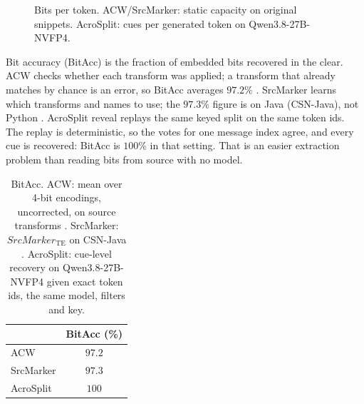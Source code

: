 \documentclass[11pt]{article}
\begin{document}
\begin{figure}[t]
\centering
{}
\caption{Bits per token.
ACW/SrcMarker: static capacity on original snippets.
AcroSplit: cues per generated token on Qwen3.8-27B-NVFP4.}
\label{fig:density}
\end{figure}

Bit accuracy (BitAcc) is the fraction of embedded bits recovered in the clear.
ACW checks whether each transform was applied; a transform that already matches by chance is an error, so BitAcc averages $97.2\%$ \citep{li2024acw}.
SrcMarker learns which transforms and names to use; the $97.3\%$ figure is on Java (CSN-Java), not Python \citep{yang2024srcmarker}.
AcroSplit reveal replays the same keyed split on the same token ids.
The replay is deterministic, so the votes for one message index agree, and every cue is recovered: BitAcc is $100\%$ in that setting.
That is an easier extraction problem than reading bits from source with no model.

\begin{table}[t]
\centering
\small
\begin{tabular}{@{}lc@{}}
\toprule
 & BitAcc (\%) \\
\midrule
ACW & $97.2$ \\
SrcMarker & $97.3$ \\
AcroSplit & $100$ \\
\bottomrule
\end{tabular}
\caption{BitAcc.
ACW: mean over 4-bit encodings, uncorrected, on source transforms \citep{li2024acw}.
SrcMarker: $SrcMarker_{\mathrm{TE}}$ on CSN-Java \citep{yang2024srcmarker}.
AcroSplit: cue-level recovery on Qwen3.8-27B-NVFP4 given exact token ids, the same model, filters and key.}
\label{tab:bitacc}
\end{table}
\end{document}
